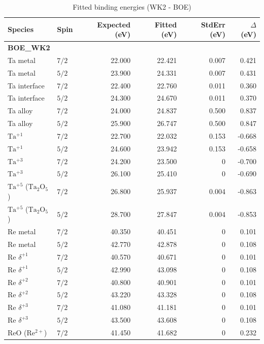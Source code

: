 \documentclass[12pt]{article}
\begin{document}
\begin{table}[H]
\centering
\begin{threeparttable}
\caption{Fitted binding energies (WK2 - BOE)}
\begin{tabular}{llrrrr}
\toprule
Species & Spin & Expected (eV) & Fitted (eV) & StdErr (eV) & $\Delta$ (eV) \\
\midrule
\multicolumn{6}{l}{\textbf{BOE\_WK2}} \\
Ta metal & $7/2$ & 22.000 & 22.421 & 0.007 & 0.421 \\
Ta metal & $5/2$ & 23.900 & 24.331 & 0.007 & 0.431 \\
Ta interface & $7/2$ & 22.400 & 22.760 & 0.011 & 0.360 \\
Ta interface & $5/2$ & 24.300 & 24.670 & 0.011 & 0.370 \\
Ta alloy & $7/2$ & 24.000 & 24.837 & 0.500 & 0.837 \\
Ta alloy & $5/2$ & 25.900 & 26.747 & 0.500 & 0.847 \\
$\mathrm{Ta^{+1}}$ & $7/2$ & 22.700 & 22.032 & 0.153 & -0.668 \\
$\mathrm{Ta^{+1}}$ & $5/2$ & 24.600 & 23.942 & 0.153 & -0.658 \\
$\mathrm{Ta^{+3}}$ & $7/2$ & 24.200 & 23.500 & 0 & -0.700 \\
$\mathrm{Ta^{+3}}$ & $5/2$ & 26.100 & 25.410 & 0 & -0.690 \\
$\mathrm{Ta^{+5}}$ ($\mathrm{Ta_2O_5}$) & $7/2$ & 26.800 & 25.937 & 0.004 & -0.863 \\
$\mathrm{Ta^{+5}}$ ($\mathrm{Ta_2O_5}$) & $5/2$ & 28.700 & 27.847 & 0.004 & -0.853 \\
Re metal & $7/2$ & 40.350 & 40.451 & 0 & 0.101 \\
Re metal & $5/2$ & 42.770 & 42.878 & 0 & 0.108 \\
$\mathrm{Re}$ $\delta^{+1}$ & $7/2$ & 40.570 & 40.671 & 0 & 0.101 \\
$\mathrm{Re}$ $\delta^{+1}$ & $5/2$ & 42.990 & 43.098 & 0 & 0.108 \\
$\mathrm{Re}$ $\delta^{+2}$ & $7/2$ & 40.800 & 40.901 & 0 & 0.101 \\
$\mathrm{Re}$ $\delta^{+2}$ & $5/2$ & 43.220 & 43.328 & 0 & 0.108 \\
$\mathrm{Re}$ $\delta^{+3}$ & $7/2$ & 41.080 & 41.181 & 0 & 0.101 \\
$\mathrm{Re}$ $\delta^{+3}$ & $5/2$ & 43.500 & 43.608 & 0 & 0.108 \\
$\mathrm{ReO}$ ($\mathrm{Re^{2+}}$) & $7/2$ & 41.450 & 41.682 & 0 & 0.232 \\

\end{tabular}
\end{threeparttable}
\end{table}
\end{document}
